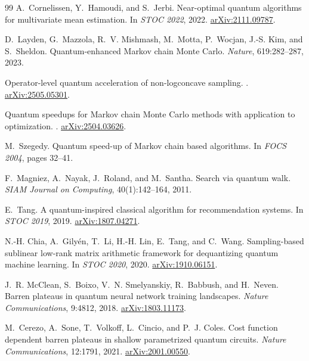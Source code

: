 \documentclass[11pt,a4paper]{article}
\theoremstyle{definition}
\begin{document}
\begin{thebibliography}{99}
A.~Cornelissen, Y.~Hamoudi, and S.~Jerbi.
\newblock Near-optimal quantum algorithms for multivariate mean estimation.
\newblock In \emph{STOC 2022}, 2022.
\newblock \href{https://arxiv.org/abs/2111.09787}{arXiv:2111.09787}.

D.~Layden, G.~Mazzola, R.~V. Mishmash, M.~Motta, P.~Wocjan, J.-S. Kim, and S.~Sheldon.
\newblock Quantum-enhanced Markov chain Monte Carlo.
\newblock \emph{Nature}, 619:282--287, 2023.

Operator-level quantum acceleration of non-logconcave sampling.
.
\newblock \href{https://arxiv.org/abs/2505.05301}{arXiv:2505.05301}.

Quantum speedups for Markov chain Monte Carlo methods with application to optimization.
.
\newblock \href{https://arxiv.org/abs/2504.03626}{arXiv:2504.03626}.

M.~Szegedy.
\newblock Quantum speed-up of Markov chain based algorithms.
\newblock In \emph{FOCS 2004}, pages 32--41.

F.~Magniez, A.~Nayak, J.~Roland, and M.~Santha.
\newblock Search via quantum walk.
\newblock \emph{SIAM Journal on Computing}, 40(1):142--164, 2011.

E.~Tang.
\newblock A quantum-inspired classical algorithm for recommendation systems.
\newblock In \emph{STOC 2019}, 2019.
\newblock \href{https://arxiv.org/abs/1807.04271}{arXiv:1807.04271}.

N.-H. Chia, A.~Gily\'{e}n, T.~Li, H.-H. Lin, E.~Tang, and C.~Wang.
\newblock Sampling-based sublinear low-rank matrix arithmetic framework for dequantizing quantum machine learning.
\newblock In \emph{STOC 2020}, 2020.
\newblock \href{https://arxiv.org/abs/1910.06151}{arXiv:1910.06151}.

J.~R. McClean, S.~Boixo, V.~N. Smelyanskiy, R.~Babbush, and H.~Neven.
\newblock Barren plateaus in quantum neural network training landscapes.
\newblock \emph{Nature Communications}, 9:4812, 2018.
\newblock \href{https://arxiv.org/abs/1803.11173}{arXiv:1803.11173}.

M.~Cerezo, A.~Sone, T.~Volkoff, L.~Cincio, and P.~J. Coles.
\newblock Cost function dependent barren plateaus in shallow parametrized quantum circuits.
\newblock \emph{Nature Communications}, 12:1791, 2021.
\newblock \href{https://arxiv.org/abs/2001.00550}{arXiv:2001.00550}.


\end{thebibliography}
\end{document}
